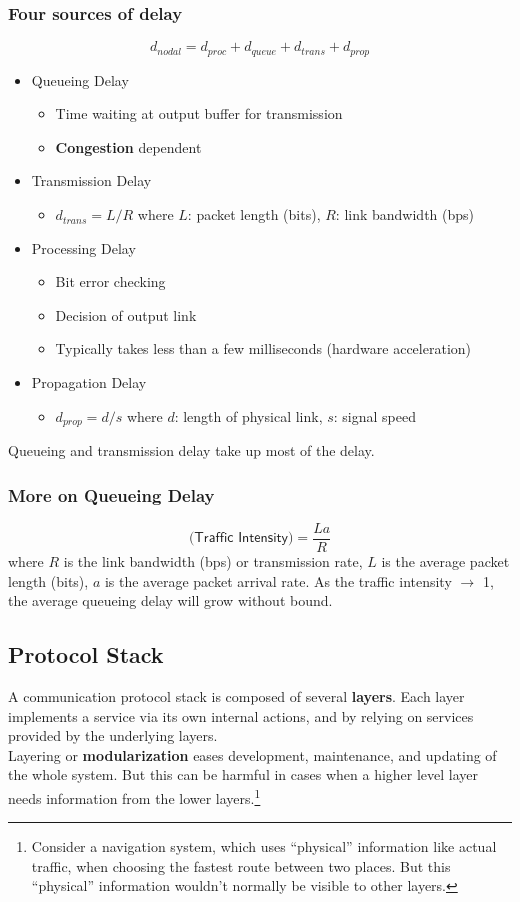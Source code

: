 \documentclass{article}
\begin{document}
\subsubsection{Four sources of delay}
$$d_{nodal} = d_{proc} + d_{queue} + d_{trans} + d_{prop}$$
\begin{itemize}
    \item Queueing Delay
    \begin{itemize}
        \item Time waiting at output buffer for transmission
        \item \textbf{Congestion} dependent
    \end{itemize}
    \item Transmission Delay
    \begin{itemize}
        \item $d_{trans} = L / R$ where $L$: packet length (bits), $R$: link bandwidth (bps)
    \end{itemize}
    \item Processing Delay
    \begin{itemize}
        \item Bit error checking
        \item Decision of output link
        \item Typically takes less than a few milliseconds (hardware acceleration)
    \end{itemize}
    \item Propagation Delay
    \begin{itemize}
        \item $d_{prop} = d / s$ where $d$: length of physical link, $s$: signal speed
    \end{itemize}
\end{itemize}
Queueing and transmission delay take up most of the delay.

\subsubsection{More on Queueing Delay}
$$\textsf{(Traffic Intensity)} = \frac{La}{R}$$
where $R$ is the link bandwidth (bps) or transmission rate, $L$ is the average packet length (bits), $a$ is the average packet arrival rate. As the traffic intensity $\rightarrow$ 1, the average queueing delay will grow without bound.

\subsection{Protocol Stack}
A communication protocol stack is composed of several \textbf{layers}. Each layer implements a service via its own internal actions, and by relying on services provided by the underlying layers.\\
Layering or \textbf{modularization} eases development, maintenance, and updating of the whole system. But this can be harmful in cases when a higher level layer needs information from the lower layers.\footnote{Consider a navigation system, which uses ``physical'' information like actual traffic, when choosing the fastest route between two places. But this ``physical'' information wouldn't normally be visible to other layers.}
\end{document}
